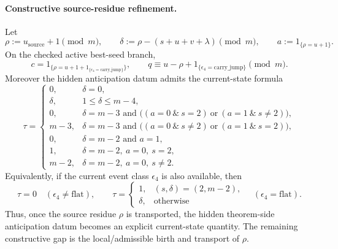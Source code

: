 \paragraph{Constructive source-residue refinement.}
Let
\[
\rho:=u_{\mathrm{source}}+1 \pmod m,
\qquad
\delta:=\rho-(s+u+v+\lambda) \pmod m,
\qquad
 a:=1_{\{\rho=u+1\}}.
\]
On the checked active best-seed branch,
\[
c = 1_{\{\rho = u + 1 + 1_{\{\epsilon_4=\mathrm{carry\_jump}\}}\}},
\qquad
q \equiv u-\rho+1_{\{\epsilon_4=\mathrm{carry\_jump}\}} \pmod m.
\]
Moreover the hidden anticipation datum admits the current-state formula
\[
\tau =
\begin{cases}
0, & \delta=0,\\[1mm]
\delta, & 1\le \delta \le m-4,\\[1mm]
0, & \delta=m-3 \text{ and } \big((a=0\ \&\ s=2)\ \text{or}\ (a=1\ \&\ s\neq 2)\big),\\[1mm]
m-3, & \delta=m-3 \text{ and } \big((a=0\ \&\ s\neq 2)\ \text{or}\ (a=1\ \&\ s=2)\big),\\[1mm]
0, & \delta=m-2 \text{ and } a=1,\\[1mm]
1, & \delta=m-2,\ a=0,\ s=2,\\[1mm]
m-2, & \delta=m-2,\ a=0,\ s\neq 2.
\end{cases}
\]
Equivalently, if the current event class $\epsilon_4$ is also available, then
\[
\tau=0 \quad (\epsilon_4\neq\mathrm{flat}),
\qquad
\tau=
\begin{cases}
1,& (s,\delta)=(2,m-2),\\
\delta,& \text{otherwise}
\end{cases}
\quad (\epsilon_4=\mathrm{flat}).
\]
Thus, once the source residue $\rho$ is transported, the hidden theorem-side
anticipation datum becomes an explicit current-state quantity. The remaining
constructive gap is the local/admissible birth and transport of $\rho$.
